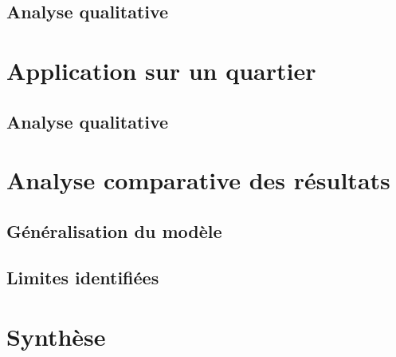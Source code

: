 \subsection{Analyse qualitative}


\section{Application sur un quartier}
\subsection{Analyse qualitative}

\section{Analyse comparative des résultats}
\subsection{Généralisation du modèle}
\subsection{Limites identifiées}

\section{Synthèse}
